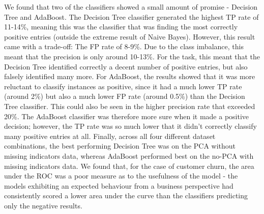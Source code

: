 \documentclass{article}
\begin{document}
We found that two of the classifiers showed a small amount of promise - Decision Tree and AdaBoost.
The Decision Tree classifier generated the highest TP rate of 11-14\%, meaning this was the classifier that was finding the most correctly positive entries (outside the extreme result of Naive Bayes).
However, this result came with a trade-off: The FP rate of 8-9\%.
Due to the class imbalance, this meant that the precision is only around 10-13\%.
For the task, this meant that the Decision Tree identified correctly a decent number of positive entries, but also falsely identified many more.
For AdaBoost, the results showed that it was more reluctant to classify instances as positive, since it had a much lower TP rate (around 2\%) but also a much lower FP rate (around 0.5\%) than the Decision Tree classifier.
This could also be seen in the higher precision rate that exceeded 20\%.
The AdaBoost classifier was therefore more sure when it made a positive decision; however, the TP rate was so much lower that it didn't correctly classify many positive entries at all.
Finally, across all four different dataset combinations, the best performing Decision Tree was on the PCA without missing indicators data, whereas AdaBoost performed best on the no-PCA with missing indicators data.
We found that, for the case of customer churn, the area under the ROC was a poor measure as to the usefulness of the model - the models exhibiting an expected behaviour from a business perspective had consistently scored a lower area under the curve than the classifiers predicting only the negative results.
\end{document}
